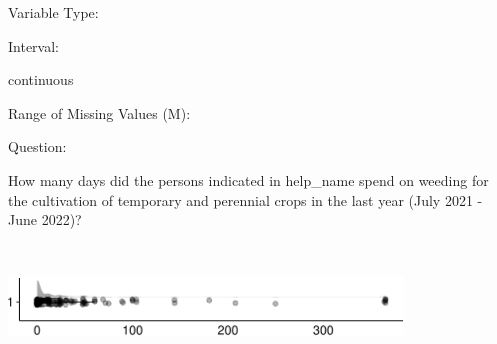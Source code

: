 \documentclass[
]{article}
\begin{document}
\begin{minipage}[t]{0.3\linewidth}

Variable Type:

\end{minipage}%
\begin{minipage}[t]{0.7\linewidth}

\end{minipage}

\begin{minipage}[t]{0.3\linewidth}

Interval:

\end{minipage}%
\begin{minipage}[t]{0.7\linewidth}

continuous

\end{minipage}

\begin{minipage}[t]{0.3\linewidth}

Range of Missing Values (M):

\end{minipage}%
\begin{minipage}[t]{0.7\linewidth}

\end{minipage}

\begin{minipage}[t]{0.3\linewidth}

Question:

\end{minipage}%
\begin{minipage}[t]{0.7\linewidth}

How many days did the persons indicated in help\_name spend on weeding
for the cultivation of temporary and perennial crops in the last year
(July 2021 - June 2022)?

\end{minipage}

\begin{minipage}[t]{0.3\linewidth}

~

\end{minipage}%
\begin{minipage}[t]{0.7\linewidth}

\includegraphics[width=396px]{codebook_template_files/figure-latex/q7_28_rainplot-1}

\end{minipage}
 \vspace*{-6mm} 
\end{document}
